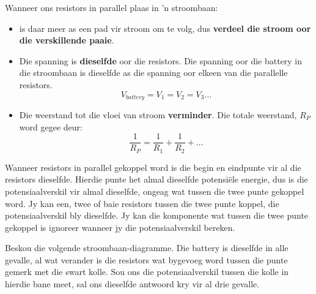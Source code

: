 \begin{mdframed}
Wanneer ons resistors in parallel plaas in 'n stroombaan:
\begin{itemize}
 \item is daar meer as een pad vir stroom om te volg, dus \textbf{verdeel die stroom oor die verskillende paaie}.
 \item Die spanning is \textbf{dieselfde} oor die resistors. Die spanning oor die battery in die stroombaan is dieselfde as die spanning oor elkeen van die parallelle resistors.
\begin{equation*}
 \boxed{V_{battery}=V_1=V_2=V_3\ldots}
\end{equation*}
\item Die weerstand tot die vloei van stroom \textbf{verminder}. Die totale weerstand, $R_P$ word gegee deur:
\begin{equation*}
 \boxed{\frac{1}{R_P} = \frac{1}{R_1}+\frac{1}{R_2}+\ldots}
\end{equation*}
\end{itemize}
\end{mdframed}

Wanneer resistors in parallel gekoppel word is die begin en eindpunte vir al
die resistors dieselfde. Hierdie punte het almal dieselfde potensi\"ele
energie, dus is die potensiaalverskil vir almal dieselfde, ongeag wat tussen die
twee punte gekoppel word. Jy kan een, twee of baie resistors tussen die twee
punte koppel, die potensiaalverskil bly dieselfde. Jy kan die komponente
wat tussen die twee punte gekoppel is ignoreer wanneer jy die potensiaalverskil
bereken.



Beskou die volgende stroombaan-diagramme. Die battery is dieselfde in alle
gevalle, al wat verander is die resistors wat bygevoeg word tussen die punte
gemerk met die swart kolle. Sou ons die potensiaalverskil tussen die kolle
in hierdie bane meet, sal ons dieselfde antwoord kry vir al drie gevalle.


